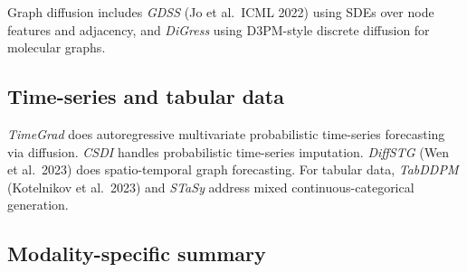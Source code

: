 \documentclass{article}
\begin{document}
Graph diffusion includes \emph{GDSS} (Jo et al.~ICML 2022) using SDEs over node features and adjacency, and \emph{DiGress} using D3PM-style discrete diffusion for molecular graphs.

\subsection{Time-series and tabular data}\label{time-series-and-tabular-data}

\emph{TimeGrad} \citep{rasul2021autoregressivedeno} does autoregressive multivariate probabilistic time-series forecasting via diffusion. \emph{CSDI} \citep{tashiro2021csdiconditionalsco} handles probabilistic time-series imputation. \emph{DiffSTG} (Wen et al.~2023) does spatio-temporal graph forecasting. For tabular data, \emph{TabDDPM} (Kotelnikov et al.~2023) and \emph{STaSy} address mixed continuous-categorical generation.

\subsection{Modality-specific summary}\label{modality-specific-summary}
\end{document}
